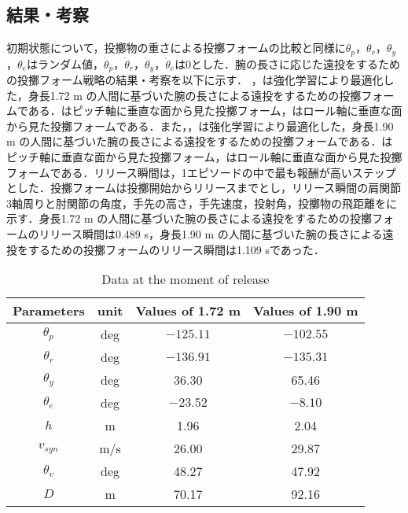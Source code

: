 \subsection{結果・考察}
初期状態について，投擲物の重さによる投擲フォームの比較と同様に$\theta_{p}$，$\theta_{r}$，$\theta_{y}$，$\theta_{e}$はランダム値，$\dot{\theta}_{p}$，$\dot{\theta}_{r}$，$\dot{\theta}_{y}$，$\dot{\theta}_{e}$は0とした．腕の長さに応じた遠投をするための投擲フォーム戦略の結果・考察を以下に示す．
，は強化学習により最適化した，身長1.72 m の人間に基づいた腕の長さによる遠投をするための投擲フォームである．はピッチ軸に垂直な面から見た投擲フォーム，はロール軸に垂直な面から見た投擲フォームである．また，，は強化学習により最適化した，身長1.90 m の人間に基づいた腕の長さによる遠投をするための投擲フォームである．はピッチ軸に垂直な面から見た投擲フォーム，はロール軸に垂直な面から見た投擲フォームである．リリース瞬間は，1エピソードの中で最も報酬が高いステップとした．投擲フォームは投擲開始からリリースまでとし，リリース瞬間の肩関節3軸周りと肘関節の角度，手先の高さ，手先速度，投射角，投擲物の飛距離をに示す．身長1.72 m の人間に基づいた腕の長さによる遠投をするための投擲フォームのリリース瞬間は0.489 s，身長1.90 m の人間に基づいた腕の長さによる遠投をするための投擲フォームのリリース瞬間は1.109 sであった．

\begin{table}[tb]
  \begin{center}
    \caption{Data at the moment of release}
    \begin{tabular}{c|c|c|c}
      \hline
      Parameters & unit & Values of 1.72 m & Values of 1.90 m \\
      \hline
      $\theta_{p}$ & deg & $-125.11$ & $-102.55$ \\
      $\theta_{r}$ & deg & $-136.91$ & $-135.31$ \\
      $\theta_{y}$ & deg  & 36.30 & 65.46 \\
      $\theta_{e}$ & deg & $-23.52$ & $-8.10$ \\
      $h$ & m & 1.96 & 2.04 \\
      $v_{syn}$ & m/s & 26.00 & 29.87 \\
      $\theta_{v}$ & deg & 48.27 & 47.92 \\
      $D$ & m & 70.17 & 92.16 \\
      \hline
    \end{tabular}
  \end{center}
\end{table}

